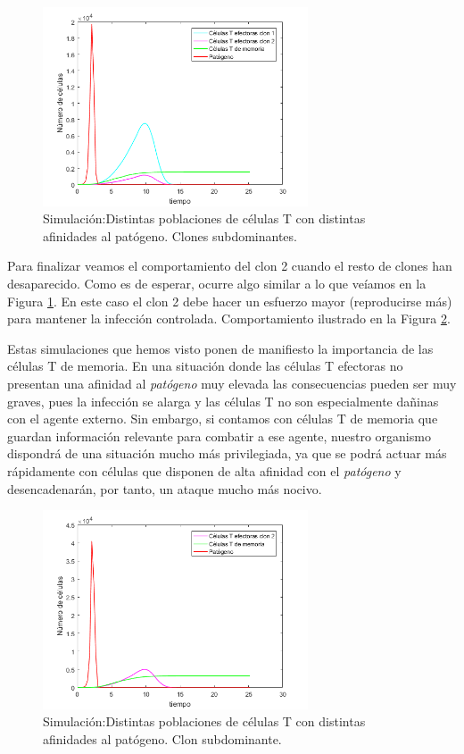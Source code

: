\begin{figure}[t]
	\centering
	\includegraphics[width=0.7\textwidth]{Imagenes/Simulaciones/dosClones}
	\caption{Simulación:Distintas poblaciones de células T con distintas afinidades al patógeno. Clones subdominantes.}
	\label{fig:dosClones}
\end{figure}

Para finalizar veamos el comportamiento del clon 2 cuando el resto de clones han desaparecido. Como es de esperar, ocurre algo similar a lo que veíamos en la Figura \ref{fig:dosClones}. En este caso el clon 2 debe hacer un esfuerzo mayor (reproducirse más) para mantener la infección controlada. Comportamiento ilustrado en la Figura \ref{fig:unClon}.

Estas simulaciones que hemos visto ponen de manifiesto la importancia de las células T de memoria. En una situación donde las células T efectoras no presentan una afinidad al \textit{patógeno} muy elevada las consecuencias pueden ser muy graves, pues la infección se alarga y las células T no son especialmente dañinas con el agente externo. Sin embargo, si contamos con células T de memoria que guardan información relevante para combatir a ese agente, nuestro organismo dispondrá de una situación mucho más privilegiada, ya que se podrá actuar más rápidamente con células que disponen de alta afinidad con el \textit{patógeno} y desencadenarán, por tanto, un ataque mucho más nocivo.

\begin{figure}[t]
	\centering
	\includegraphics[width=0.7\textwidth]{Imagenes/Simulaciones/unClon}
	\caption{Simulación:Distintas poblaciones de células T con distintas afinidades al patógeno. Clon subdominante.}
	\label{fig:unClon}
\end{figure}

